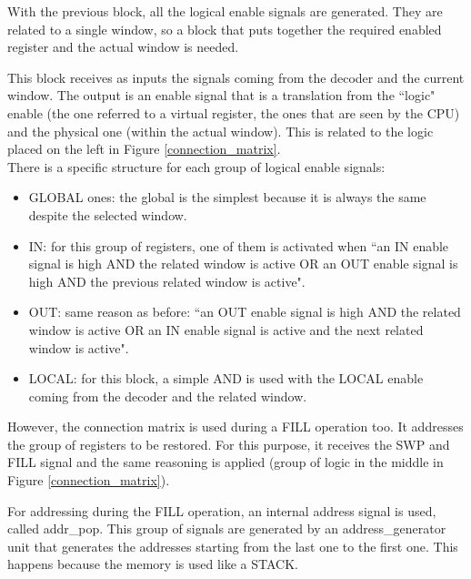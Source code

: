 With the previous block, all the logical enable signals are generated. They are related to a single window, so a block that puts together the required enabled register and the actual window is needed. 

This block receives as inputs the signals coming from the decoder and the current window. The output is an enable signal that is a translation from the ``logic" enable (the one referred to a virtual register, the ones that are seen by the CPU) and the physical one (within the actual window). This is related to the logic placed on the left in Figure \ref{connection_matrix}.\\

There is a specific structure for each group of logical enable signals:
\begin{itemize}
  \item GLOBAL ones: the global is the simplest because it is always the same despite the selected window.
  \item IN: for this group of registers, one of them is activated when ``an IN enable signal is high AND the related window is active OR an OUT enable signal is high AND the previous related window is active".
  \item OUT: same reason as before: ``an OUT enable signal is high AND the related window is active OR an IN enable signal is active and the next related window is active".
  \item LOCAL: for this block, a simple AND is used with the LOCAL enable coming from the decoder and the related window. 
\end{itemize}

However, the connection matrix is used during a FILL operation too. It addresses the group of registers to be restored. For this purpose, it receives the SWP and FILL signal and the same reasoning is applied (group of logic in the middle in Figure \ref{connection_matrix}).

For addressing during the FILL operation, an internal address signal is used, called addr\_pop. This group of signals are generated by an address\_generator unit that generates the addresses starting from the last one to the first one. This happens because the memory is used like a STACK.\\

